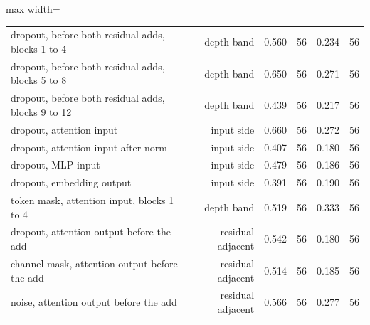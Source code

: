 \begin{table}[htbp]
\begin{adjustbox}{max width=\linewidth}
\begin{tabular}{lrrrrr}
dropout, before both residual adds, blocks 1 to 4 & depth band & 0.560 & 56 & 0.234 & 56 \\
dropout, before both residual adds, blocks 5 to 8 & depth band & 0.650 & 56 & 0.271 & 56 \\
dropout, before both residual adds, blocks 9 to 12 & depth band & 0.439 & 56 & 0.217 & 56 \\
dropout, attention input & input side & 0.660 & 56 & 0.272 & 56 \\
dropout, attention input after norm & input side & 0.407 & 56 & 0.180 & 56 \\
dropout, MLP input & input side & 0.479 & 56 & 0.186 & 56 \\
dropout, embedding output & input side & 0.391 & 56 & 0.190 & 56 \\
token mask, attention input, blocks 1 to 4 & depth band & 0.519 & 56 & 0.333 & 56 \\
dropout, attention output before the add & residual adjacent & 0.542 & 56 & 0.180 & 56 \\
channel mask, attention output before the add & residual adjacent & 0.514 & 56 & 0.185 & 56 \\
noise, attention output before the add & residual adjacent & 0.566 & 56 & 0.277 & 56 \\
\bottomrule
\end{tabular}
\end{adjustbox}
\end{table}
